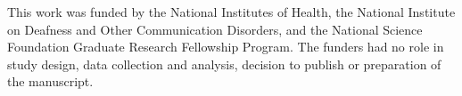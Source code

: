 This work was funded by the National Institutes of Health, the National Institute on Deafness and Other Communication Disorders, and the National Science Foundation Graduate Research Fellowship Program. The funders had no role in study design, data collection and analysis, decision to publish or preparation of the manuscript.